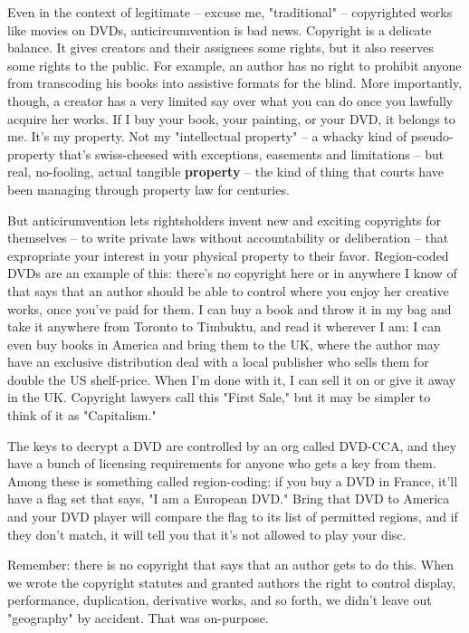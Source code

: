 Even in the context of legitimate -- excuse me, "traditional" --
copyrighted works like movies on DVDs, anticircumvention is bad
news. Copyright is a delicate balance. It gives creators and their
assignees some rights, but it also reserves some rights to the
public. For example, an author has no right to prohibit anyone from
transcoding his books into assistive formats for the blind. More
importantly, though, a creator has a very limited say over what you
can do once you lawfully acquire her works. If I buy your book,
your painting, or your DVD, it belongs to me. It's my property. Not
my "intellectual property" -- a whacky kind of pseudo-property
that's swiss-cheesed with exceptions, easements and limitations --
but real, no-fooling, actual tangible \textbf{property} -- the kind
of thing that courts have been managing through property law for
centuries.

But anticirumvention lets rightsholders invent new and exciting
copyrights for themselves -- to write private laws without
accountability or deliberation -- that expropriate your interest in
your physical property to their favor. Region-coded DVDs are an
example of this: there's no copyright here or in anywhere I know of
that says that an author should be able to control where you enjoy
her creative works, once you've paid for them. I can buy a book and
throw it in my bag and take it anywhere from Toronto to Timbuktu,
and read it wherever I am: I can even buy books in America and
bring them to the UK, where the author may have an exclusive
distribution deal with a local publisher who sells them for double
the US shelf-price. When I'm done with it, I can sell it on or give
it away in the UK. Copyright lawyers call this "First Sale," but it
may be simpler to think of it as "Capitalism."

The keys to decrypt a DVD are controlled by an org called DVD-CCA,
and they have a bunch of licensing requirements for anyone who gets
a key from them. Among these is something called region-coding: if
you buy a DVD in France, it'll have a flag set that says, "I am a
European DVD." Bring that DVD to America and your DVD player will
compare the flag to its list of permitted regions, and if they
don't match, it will tell you that it's not allowed to play your
disc.

Remember: there is no copyright that says that an author gets to do
this. When we wrote the copyright statutes and granted authors the
right to control display, performance, duplication, derivative
works, and so forth, we didn't leave out "geography" by accident.
That was on-purpose.

